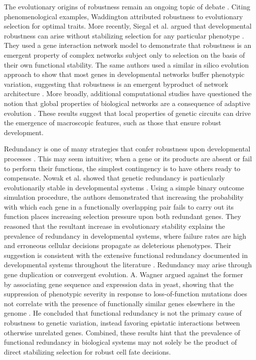 The evolutionary origins of robustness remain an ongoing topic of debate \cite{Siegal2014}. Citing phenomenological examples, Waddington attributed robustness to evolutionary selection for optimal traits. More recently, Siegal et al. argued that developmental robustness can arise without stabilizing selection for any particular phenotype \cite{Siegal2002}. They used a gene interaction network model to demonstrate that robustness is an emergent property of complex networks subject only to selection on the basis of their own functional stability. The same authors used a similar in silico evolution approach to show that most genes in developmental networks buffer phenotypic variation, suggesting that robustness is an emergent byproduct of network architecture \cite{Bergman2003}. More broadly, additional computational studies have questioned the notion that global properties of biological networks are a consequence of adaptive evolution \cite{Lynch2007,Wagner2003}. These results suggest that local properties of genetic circuits can drive the emergence of macroscopic features, such as those that ensure robust development.

Redundancy is one of many strategies that confer robustness upon developmental processes \cite{Hartman2001,McAdams1999}. This may seem intuitive; when a gene or its products are absent or fail to perform their functions, the simplest contingency is to have others ready to compensate. Nowak et al. showed that genetic redundancy is particularly evolutionarily stable in developmental systems \cite{Nowak1997}. Using a simple binary outcome simulation procedure, the authors demonstrated that increasing the probability with which each gene in a functionally overlapping pair fails to carry out its function places increasing selection pressure upon both redundant genes. They reasoned that the resultant increase in evolutionary stability explains the prevalence of redundancy in developmental systems, where failure rates are high and erroneous cellular decisions propagate as deleterious phenotypes. Their suggestion is consistent with the extensive functional redundancy documented in developmental systems throughout the literature \cite{Kitano2004}. Redundancy may arise through gene duplication or convergent evolution. A. Wagner argued against the former by associating gene sequence and expression data in yeast, showing that the suppression of phenotypic severity in response to loss-of-function mutations does not correlate with the presence of functionally similar genes elsewhere in the genome \cite{Wagner2000}. He concluded that functional redundancy is not the primary cause of robustness to genetic variation, instead favoring epistatic interactions between otherwise unrelated genes. Combined, these results hint that the prevalence of functional redundancy in biological systems may not solely be the product of direct stabilizing selection for robust cell fate decisions.

